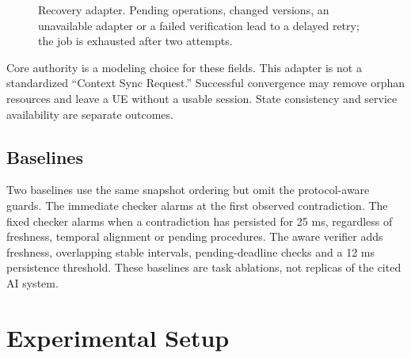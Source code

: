 \documentclass[conference]{IEEEtran}
\begin{document}
\begin{figure}[t]
\centering
{}
\caption{Recovery adapter. Pending operations, changed versions, an unavailable adapter or a failed verification lead to a delayed retry; the job is exhausted after two attempts.}
\label{fig:recovery}
\end{figure}

Core authority is a modeling choice for these fields. This adapter is not a standardized ``Context Sync Request.'' Successful convergence may remove orphan resources and leave a UE without a usable session. State consistency and service availability are separate outcomes.

\subsection{Baselines}
Two baselines use the same snapshot ordering but omit the protocol-aware guards. The immediate checker alarms at the first observed contradiction. The fixed checker alarms when a contradiction has persisted for 25 ms, regardless of freshness, temporal alignment or pending procedures. The aware verifier adds freshness, overlapping stable intervals, pending-deadline checks and a 12 ms persistence threshold. These baselines are task ablations, not replicas of the cited AI system.

\section{Experimental Setup}
\end{document}
